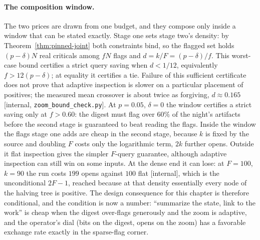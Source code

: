 \documentclass[11pt,a4paper]{article}
\theoremstyle{definition}
\theoremstyle{plain}
\begin{document}
\paragraph{The composition window.} The two prices are drawn from one budget, and
they compose only inside a window that can be stated exactly. Stage one sets stage
two's density: by Theorem~\ref{thm:pinned-joint} both constraints bind, so the
flagged set holds $(p-\delta)N$ real criticals among $fN$ flags and
$d=k/F=(p-\delta)/f$. This worst-case bound certifies a strict query saving
when $d<1/12$, equivalently $f>12(p-\delta)$; at equality it certifies a tie.
Failure of this sufficient certificate does not prove that adaptive inspection
is slower on a particular placement of positives;
the measured mean crossover is about twice as forgiving, $d\approx0.165$
[internal, \texttt{zoom\_bound\_check.py}]. At $p{=}0.05$, $\delta{=}0$ the window
certifies a strict saving only at $f>0.60$: the digest must flag over $60\%$ of the night's artifacts
before the second stage is guaranteed to beat reading the flags. Inside the window
the flags stage one adds are cheap in the second stage, because $k$ is fixed by the
source and doubling $F$ costs only the logarithmic term, $2k$ further opens.
Outside it flat inspection gives the simpler $F$-query guarantee, although
adaptive inspection can still win on some inputs. At the dense end it can lose: at
$F{=}100$, $k{=}90$ the run costs $199$ opens against $100$ flat [internal], which
is the unconditional $2F-1$, reached because at that density essentially every
node of the halving tree is positive. The design consequence for this chapter is
therefore conditional, and the condition is now a number: ``summarize the state,
link to the work'' is cheap when the digest over-flags generously and the zoom is
adaptive, and the operator's dial (bits on the digest, opens on the zoom) has a
favorable exchange rate exactly in the sparse-flag corner.
\end{document}
